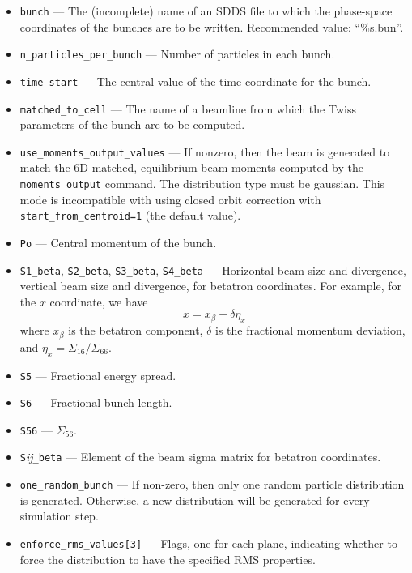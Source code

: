 \documentclass[11pt]{article}
\begin{document}
\begin{itemize}
\item \verb|bunch| --- The (incomplete) name of an SDDS file to which the phase-space coordinates
of the bunches are to be written.  Recommended value: ``\%s.bun''.  
\item \verb|n_particles_per_bunch| --- Number of particles in each bunch.
\item \verb|time_start| --- The central value of the time coordinate for the bunch.
\item \verb|matched_to_cell| --- The name of a beamline from which the Twiss parameters of the bunch
are to be computed.
\item \verb|use_moments_output_values| --- If nonzero, then the beam is generated to match the
  6D matched, equilibrium beam moments computed by the \verb|moments_output| command.
  The distribution type must be gaussian.
  This mode is incompatible with using closed orbit correction with \verb|start_from_centroid=1|
  (the default value).
\item \verb|Po| --- Central momentum of the bunch.

\item \verb|S1_beta|, \verb|S2_beta|, \verb|S3_beta|, \verb|S4_beta| --- Horizontal beam size and divergence, vertical
  beam size and divergence, for betatron coordinates. For example, for the $x$ coordinate, we have
\begin{equation}
x = x_\beta + \delta \eta_x
\end{equation}
where $x_\beta$ is the betatron component, $\delta$ is the fractional momentum deviation, and $\eta_x = \Sigma_{16}/\Sigma_{66}$.
\item \verb|S5| --- Fractional energy spread.
\item \verb|S6| --- Fractional bunch length.
\item \verb|S56| --- $\Sigma_{56}$.
\item \verb|S|{\em i}{\em j}\verb|_beta| --- Element of the beam sigma matrix for betatron coordinates.

\item \verb|one_random_bunch| --- If non-zero, then only one random
particle distribution is generated.  Otherwise, a new distribution
will be generated for every simulation step.

\item \verb|enforce_rms_values[3]| --- Flags, one for each plane,
indicating whether to force the distribution to have the specified RMS
properties.


\end{itemize}
\end{document}
